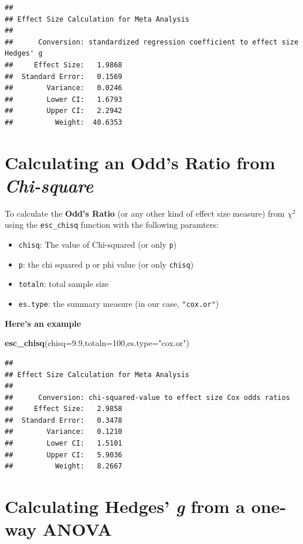 \documentclass[]{book}
\newenvironment{Shaded}{\begin{snugshade}}{\end{snugshade}}
\newcommand{\DataTypeTok}[1]{\textcolor[rgb]{0.13,0.29,0.53}{#1}}
\newcommand{\DecValTok}[1]{\textcolor[rgb]{0.00,0.00,0.81}{#1}}
\newcommand{\FloatTok}[1]{\textcolor[rgb]{0.00,0.00,0.81}{#1}}
\newcommand{\KeywordTok}[1]{\textcolor[rgb]{0.13,0.29,0.53}{\textbf{#1}}}
\newcommand{\NormalTok}[1]{#1}
\newcommand{\StringTok}[1]{\textcolor[rgb]{0.31,0.60,0.02}{#1}}
\providecommand{\tightlist}{%
  \setlength{\itemsep}{0pt}\setlength{\parskip}{0pt}}
\begin{document}
\begin{verbatim}
## 
## Effect Size Calculation for Meta Analysis
## 
##      Conversion: standardized regression coefficient to effect size Hedges' g
##     Effect Size:   1.9868
##  Standard Error:   0.1569
##        Variance:   0.0246
##        Lower CI:   1.6793
##        Upper CI:   2.2942
##          Weight:  40.6353
\end{verbatim}

\hypertarget{c}{%
\section{\texorpdfstring{Calculating an Odd's Ratio from \emph{Chi-square}}{Calculating an Odd's Ratio from Chi-square}}\label{c}}

To calculate the \textbf{Odd's Ratio} (or any other kind of effect size measure) from \(\chi^2\) using the \texttt{esc\_chisq} function with the following paramters:

\begin{itemize}
\tightlist
\item
  \texttt{chisq}: The value of Chi-squared (or only \texttt{p})
\item
  \texttt{p}: the chi squared p or phi value (or only \texttt{chisq})
\item
  \texttt{totaln}: total sample size
\item
  \texttt{es.type}: the summary measure (in our case, \texttt{"cox.or"})
\end{itemize}

\textbf{Here's an example}

\begin{Shaded}
\begin{Highlighting}[]
\KeywordTok{esc_chisq}\NormalTok{(}\DataTypeTok{chisq=}\FloatTok{9.9}\NormalTok{,}\DataTypeTok{totaln=}\DecValTok{100}\NormalTok{,}\DataTypeTok{es.type=}\StringTok{"cox.or"}\NormalTok{)}
\end{Highlighting}
\end{Shaded}

\begin{verbatim}
## 
## Effect Size Calculation for Meta Analysis
## 
##      Conversion: chi-squared-value to effect size Cox odds ratios
##     Effect Size:   2.9858
##  Standard Error:   0.3478
##        Variance:   0.1210
##        Lower CI:   1.5101
##        Upper CI:   5.9036
##          Weight:   8.2667
\end{verbatim}

\hypertarget{d}{%
\section{\texorpdfstring{Calculating Hedges' \emph{g} from a one-way ANOVA}{Calculating Hedges' g from a one-way ANOVA}}\label{d}}
\end{document}
